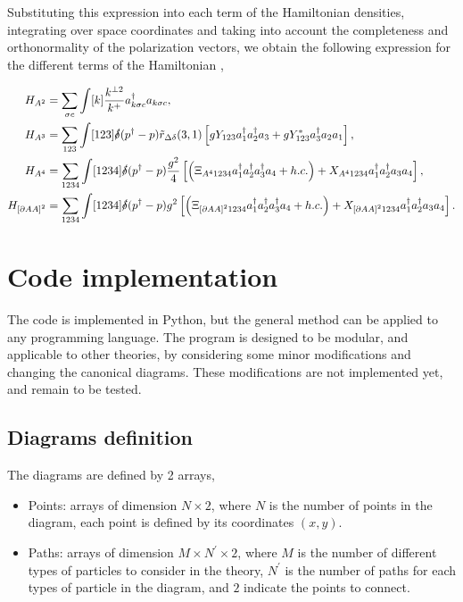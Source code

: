 \documentclass[11pt,a4paper,twoside,pdf]{article}
\numberwithin{equation}{section}
\begin{document}
Substituting this expression into each term of the Hamiltonian densities, integrating
over space coordinates and taking into account the completeness and orthonormality 
of the polarization vectors, we obtain the following expression for the different
terms of the Hamiltonian \cite{QCDG}, 

\begin{align}
    H_{A^2} &= \sum_{\sigma c} \int [k] \frac{k^{\perp 2}}{k^+}a^\dagger_{k\sigma c}
    a_{k\sigma c},\\
    H_{A^3} &= \sum_{123} \int [123] \slashed{\delta}(p^\dagger - p) \tilde{r}_{\Delta \delta}
    (3, 1) \left[ gY_{123}a_1^\dagger a_2^\dagger a_3 + gY_{123}^*a_3^\dagger a_2 a_1 \right],\\
    H_{A^4} &= \sum_{1234} \int [1234] \slashed{\delta}(p^\dagger - p) \frac{g^2}{4}
    \left[ \left( \Xi_{A^4 1234} a_1^\dagger a_2^\dagger a_3^\dagger a_4 + h.c. \right)+ X_{A^4 1234} 
    a_1^\dagger a_2^\dagger a_3 a_4  \right],\\
    H_{\left[ \partial A A \right]^2} &= \sum_{1234} \int [1234] \slashed{\delta}
    (p^\dagger - p) g^2 \left[ \left( \Xi_{\left[ \partial A A \right]^2 1234}
    a_1^\dagger a_2^\dagger a_3^\dagger a_4 + h.c. \right) + X_{\left[ \partial A A \right]^2 
    1234} a_1^\dagger a_2^\dagger a_3 a_4  \right].
\end{align}

\section{Code implementation} \label{sec:code}

The code is implemented in Python, but the general method can be applied to any 
programming language. The program is designed to be modular, and applicable to
other theories, by considering some minor modifications and changing the canonical
diagrams. These modifications are not implemented yet, and remain to be tested.

\subsection{Diagrams definition}

The diagrams are defined by 2 arrays, 
\begin{itemize}
    \item Points: arrays of dimension $N \times 2$, where $N$ is the number of 
    points in the diagram, each point is defined by its coordinates $(x,y)$.
    \item Paths: arrays of dimension $M \times N^\prime \times 2$, where $M$ is the
    number of different types of particles to consider in the theory, $N^\prime$ 
    is the number of paths for each types of particle in the diagram, and $2$ indicate
    the points to connect.
\end{itemize}
\end{document}
